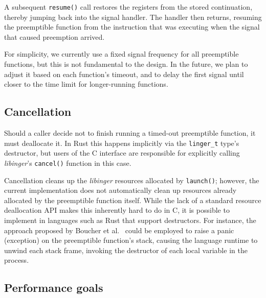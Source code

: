 A subsequent \texttt{resume()} call restores the registers from the stored
continuation, thereby jumping back into the signal handler.  The handler then
returns, resuming the preemptible function from the instruction that was executing
when the signal that caused preemption arrived.

For simplicity, we currently use a fixed signal frequency for all preemptible
functions, but this is not fundamental to the design.  In the future, we plan to
adjust it based on each function's timeout, and to delay the first signal until
closer to the time limit for longer-running functions.




\subsection{Cancellation}

Should a caller decide not to finish running a timed-out preemptible function, it
must deallocate it.  In Rust this happens implicitly via the \texttt{linger\_t}
type's destructor, but users of the C interface are responsible for explicitly
calling \textit{libinger}'s \texttt{cancel()} function in this case.

Cancellation cleans up the \textit{libinger} resources allocated by
\texttt{launch()};
however, the current implementation
does not automatically clean up resources already allocated by the
preemptible function itself.  While the lack of a standard resource deallocation API
makes this inherently hard to do in C, it is possible to implement in languages
such as Rust that support destructors.  For instance, the approach proposed by
Boucher et al.~\cite{boucher:atc2018} could be employed to raise a panic
(exception) on the preemptible function's stack, causing the language runtime
to unwind each stack frame, invoking the destructor of each local variable in
the process.


\subsection{Performance goals}


